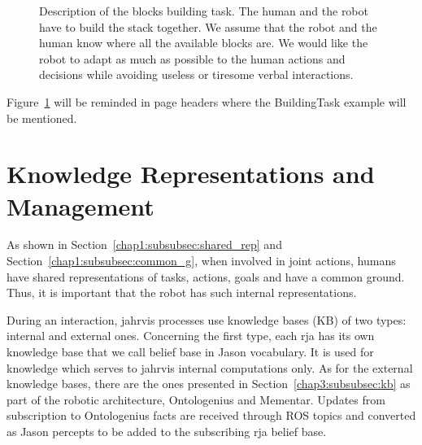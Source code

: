 \documentclass[a4paper,11pt,twoside]{StyleThese}
\begin{document}
\begin{figure}[!htb]
	\hspace*{\fill}%
	\hfill
	\hspace*{\fill}
	\caption{Description of the blocks building task. The human and the robot have to build the stack together. We assume that the robot and the human know where all the available blocks are. We would like the robot to adapt as much as possible to the human actions and decisions while avoiding useless or tiresome verbal interactions.}
	\label{chap6:fig:task_blocks}
\end{figure}

Figure~\ref{chap6:fig:task_blocks} will be reminded in page headers where the BuildingTask example will be mentioned.

\section{Knowledge Representations and Management}\label{chap6:sec:know}
As shown in Section~\ref{chap1:subsubsec:shared_rep} and Section~\ref{chap1:subsubsec:common_g}, when involved in joint actions, humans have shared representations of tasks, actions, goals and have a common ground. Thus, it is important that the robot has such internal representations.

During an interaction, \acrshort{jahrvis} processes use knowledge bases (KB) of two types: internal and external ones. Concerning the first type, each \acrshort{rja} has its own knowledge base that we call belief base in Jason vocabulary. It is used for knowledge which serves to \acrshort{jahrvis} internal computations only. As for the external knowledge bases, there are the ones presented in Section~\ref{chap3:subsubsec:kb} as part of the robotic architecture, Ontologenius and Mementar. Updates from subscription to Ontologenius facts are received through ROS topics and converted as Jason percepts to be added to the subscribing \acrshort{rja} belief base. 
\end{document}
